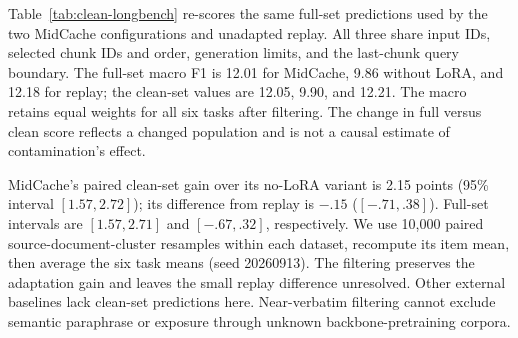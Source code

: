 
Table~\ref{tab:clean-longbench} re-scores the same full-set predictions used by the two MidCache configurations and unadapted replay. All three share input IDs, selected chunk IDs and order, generation limits, and the last-chunk query boundary. The full-set macro F1 is 12.01 for MidCache, 9.86 without LoRA, and 12.18 for replay; the clean-set values are 12.05, 9.90, and 12.21. The macro retains equal weights for all six tasks after filtering. The change in full versus clean score reflects a changed population and is not a causal estimate of contamination's effect.

MidCache's paired clean-set gain over its no-LoRA variant is 2.15 points (95\% interval $[1.57,2.72]$); its difference from replay is $-.15$ ($[-.71,.38]$). Full-set intervals are $[1.57,2.71]$ and $[-.67,.32]$, respectively. We use 10,000 paired source-document-cluster resamples within each dataset, recompute its item mean, then average the six task means (seed 20260913). The filtering preserves the adaptation gain and leaves the small replay difference unresolved. Other external baselines lack clean-set predictions here. Near-verbatim filtering cannot exclude semantic paraphrase or exposure through unknown backbone-pretraining corpora.
